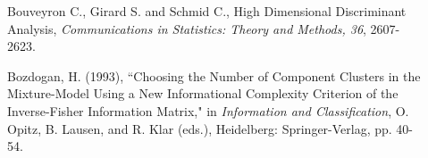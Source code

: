 \begin{description}
\item[    ] Bouveyron C., Girard S. and Schmid C., High Dimensional Discriminant Analysis, {\em Communications in Statistics:
Theory and Methods, 36}, 2607-2623.
\item[    ] Bozdogan, H. (1993), ``Choosing the Number of Component Clusters in the
Mixture-Model Using a New Informational Complexity Criterion of the
Inverse-Fisher Information Matrix," in {\em Information and Classification},
O. Opitz, B. Lausen, and R.
Klar (eds.), Heidelberg: Springer-Verlag,  pp. 40-54.

\end{description}
